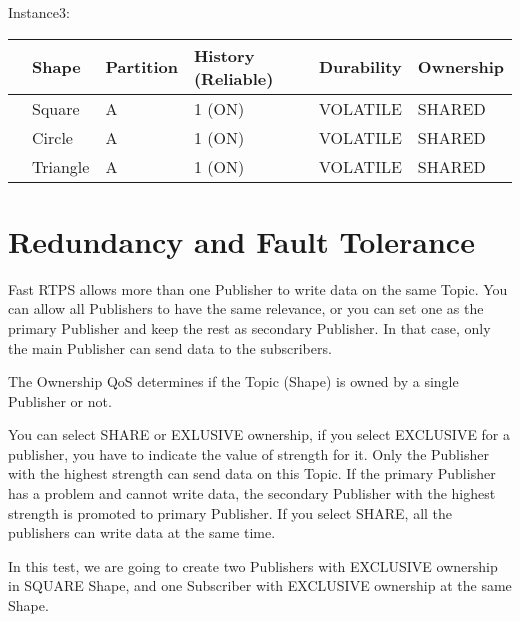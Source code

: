 \documentclass[letterpaper,10pt,english]{sphinxmanual}
\begin{document}
Instance3:


\begin{savenotes}\sphinxattablestart
\centering
\begin{tabulary}{\linewidth}[t]{|T|T|T|T|T|T|}
\hline
\sphinxstyletheadfamily &\sphinxstyletheadfamily 
Shape
&\sphinxstyletheadfamily 
Partition
&\sphinxstyletheadfamily 
History (Reliable)
&\sphinxstyletheadfamily 
Durability
&\sphinxstyletheadfamily 
Ownership
\\
\hline&
Square
&
A
&
1 (ON)
&
VOLATILE
&
SHARED
\\
\hline
{}
&
Circle
&
A
&
1 (ON)
&
VOLATILE
&
SHARED
\\
\hline&
Triangle
&
A
&
1 (ON)
&
VOLATILE
&
SHARED
\\
\hline
\end{tabulary}
\par
\sphinxattableend\end{savenotes}



\chapter{Redundancy and Fault Tolerance}
\label{\detokenize{redundancey_fault_tolerance:redundancy-and-fault-tolerance}}\label{\detokenize{redundancey_fault_tolerance::doc}}
Fast RTPS allows more than one Publisher to write data on the same Topic. You can allow all Publishers to have the same relevance, or you can set one as the primary Publisher and keep the rest as secondary Publisher. In that case, only the main Publisher can send data to the subscribers.

The Ownership QoS determines if the Topic (Shape) is owned by a single Publisher or not.

You can select SHARE or EXLUSIVE ownership, if you select EXCLUSIVE for a publisher, you have to indicate the value of strength for it. Only the Publisher with the highest strength can send data on this Topic. If the primary Publisher has a problem and cannot write data, the secondary Publisher with the highest strength is promoted to primary Publisher. If you select SHARE, all the publishers can write data at the same time.

In this test, we are going to create two Publishers with EXCLUSIVE ownership in SQUARE Shape, and one Subscriber with EXCLUSIVE ownership at the same Shape.
\end{document}
